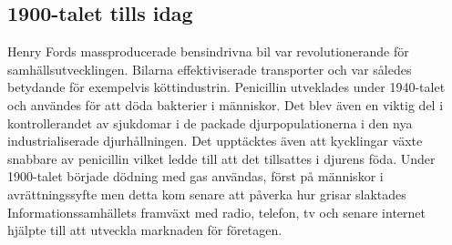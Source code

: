 \subsection{1900-talet tills idag}
Henry Fords massproducerade bensindrivna bil var revolutionerande för samhällsutvecklingen. Bilarna effektiviserade transporter och var således betydande för exempelvis köttindustrin. \citep{denskapande}
\newline
\newline
Penicillin utveklades under 1940-talet och användes för att döda bakterier i människor. Det blev även en viktig del i kontrollerandet av sjukdomar i de packade djurpopulationerna i den nya industrialiserade djurhållningen. Det upptäcktes även att kycklingar växte snabbare av penicillin vilket ledde till att det tillsattes i djurens föda. \citep{denskapande}
\newline
\newline
Under 1900-talet började dödning med gas användas, först på människor i avrättningssyfte men detta kom senare att påverka hur grisar slaktades \citep{denskapande}
\newline
\newline
Informationssamhällets framväxt med radio, telefon, tv och senare internet hjälpte till att utveckla marknaden för företagen. \citep{kommunikation}